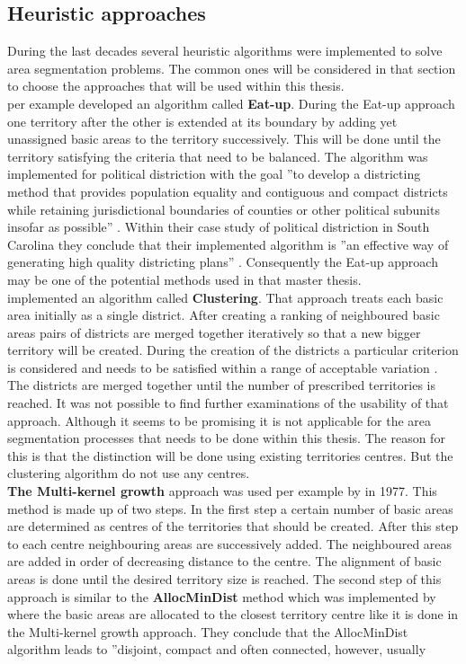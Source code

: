 \subsection{Heuristic approaches}
During the last decades several heuristic algorithms were implemented to solve area segmentation problems. The common ones will be considered in that section to choose the approaches that will be used within this thesis. \\
\citeauthor{mehrotra} \cite{mehrotra} per example developed an algorithm called \textbf{Eat-up}. During the Eat-up approach one territory after the other is extended at its boundary by adding yet unassigned basic areas to the territory successively. This will be done until the territory satisfying the criteria that need to be balanced. The algorithm was implemented for political distriction with the goal ''to develop a districting method that provides population equality and contiguous and compact districts while retaining jurisdictional boundaries of counties or other political subunits insofar as possible'' \cite{mehrotra}. Within their case study of political distriction in South Carolina they conclude that their implemented algorithm is ''an effective way of generating high quality districting plans'' \cite{mehrotra}. Consequently the Eat-up approach may be one of the potential methods used in that master thesis.\\
\citeauthor{deckro} \cite{deckro} implemented an algorithm called \textbf{Clustering}. That approach treats each basic area initially as a single district. After creating a ranking of neighboured basic areas pairs of districts are merged together iteratively so that a new bigger territory will be created. During the creation of the districts a particular criterion is considered and needs to be satisfied within a range of acceptable variation \cite{deckro}. The districts are merged together until the number of prescribed territories is reached. It was not possible to find further examinations of the usability of that approach. Although it seems to be promising it is not applicable for the area segmentation processes that needs to be done within this thesis. The reason for this is that the distinction will be done using existing territories centres. But the clustering algorithm do not use any centres. \\
\textbf{The Multi-kernel growth} approach was used per example by \citeauthor{bodin}\cite{bodin} in 1977. This method is made up of two steps. In the first step a certain number of basic areas are determined as centres of the territories that should be created. After this step to each centre neighbouring areas are successively added. The neighboured areas are added in order of decreasing distance to the centre. The alignment of basic areas is done until the desired territory size is reached. The second step of this approach is similar to the \textbf{AllocMinDist} method which was implemented by \citeauthor{kalcsics2} \cite{kalcsics2} where the basic areas are allocated to the closest territory centre like it is done in the Multi-kernel growth approach. They conclude that the AllocMinDist algorithm leads to ''disjoint, compact and often connected, however, usually

